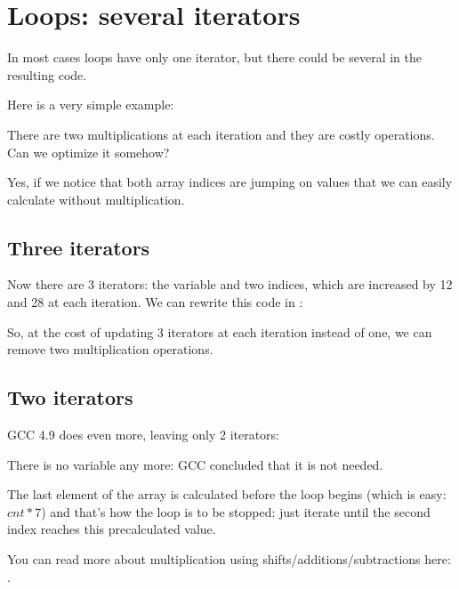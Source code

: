 ﻿\chapter{Loops: several iterators}
\label{loop_iterators}

In most cases loops have only one iterator, but there could be several in the resulting code.

Here is a very simple example:



There are two multiplications at each iteration and they are costly operations.
Can we optimize it somehow?

Yes, if we notice that both array indices are jumping on values that we can easily calculate without 
multiplication.

\section{Three iterators}



Now there are 3 iterators: the  variable and two indices, which are increased by 12 and 28 at 
each iteration.
We can rewrite this code in \CCpp:



So, at the cost of updating 3 iterators at each iteration instead of one, 
we can remove two multiplication operations.

\section{Two iterators}

GCC 4.9 does even more, leaving only 2 iterators:



There is no  variable any more: GCC concluded that it is not needed.

The last element of the  array is calculated before the loop begins (which is easy: $cnt*7$) 
and that's how the loop is to be stopped: just iterate until the second index reaches this precalculated value.

You can read more about multiplication using shifts/additions/subtractions here: 
.


